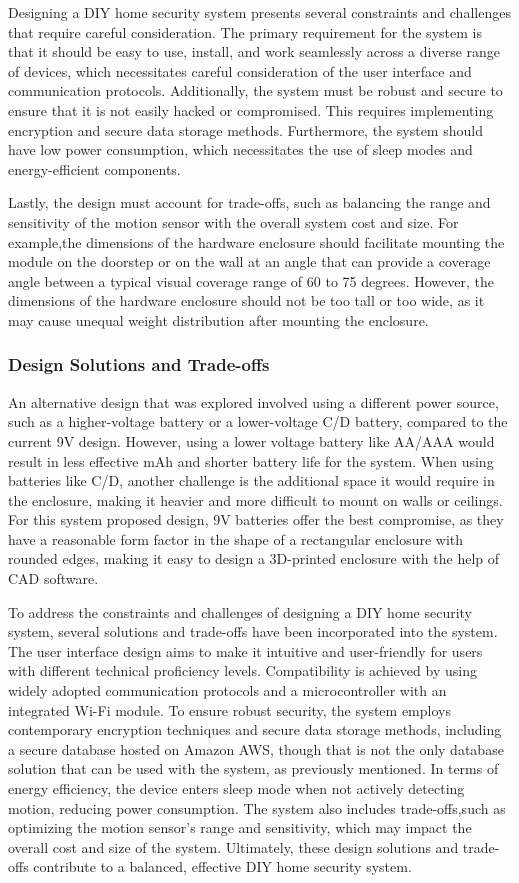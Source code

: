 Designing a DIY home security system presents several constraints and challenges that
require careful consideration. The primary requirement for the system is that it should be
easy to use, install, and work seamlessly across a diverse range of devices, which
necessitates careful consideration of the user interface and communication protocols.
Additionally, the system must be robust and secure to ensure that it is not easily
hacked or compromised. This requires implementing encryption and secure data storage methods.
Furthermore, the system should have low power consumption, which necessitates the use of sleep
modes and energy-efficient components.

Lastly, the design must account for trade-offs, such as balancing the range and sensitivity of
the motion sensor with the overall system cost and size. For example,the dimensions of the
hardware enclosure should facilitate mounting the module on the doorstep or on the wall at an
angle that can provide a coverage angle between a typical visual coverage range of 60 to 75
degrees. However, the dimensions of the hardware enclosure should not be too tall or too wide,
as it may cause unequal weight distribution after mounting the enclosure.

\subsubsection{Design Solutions and Trade-offs}

An alternative design that was explored involved using a different power source, such as a
higher-voltage battery or a lower-voltage C/D battery, compared to the current 9V design.
However, using a lower voltage battery like AA/AAA would result in less effective mAh and
shorter battery life for the system. When using batteries like C/D, another challenge is the
additional space it would require in the enclosure, making it heavier and more difficult to
mount on walls or ceilings. For this system proposed design, 9V batteries offer the best compromise, as they have a reasonable form factor in the shape of a rectangular enclosure with rounded edges, making it easy to design a 3D-printed enclosure with the help of CAD software.

To address the constraints and challenges of designing a DIY home security system, several
solutions and trade-offs have been incorporated into the system. The user interface design
aims to make it intuitive and user-friendly for users with different technical proficiency
levels. Compatibility is achieved by using widely adopted communication protocols and a
microcontroller with an integrated Wi-Fi module. To ensure robust security, the system employs
contemporary encryption techniques and secure data storage methods, including a secure
database hosted on Amazon AWS, though that is not the only database solution that can be used
with the system, as previously mentioned. In terms of energy efficiency, the device enters
sleep mode when not actively detecting motion, reducing power consumption. The system also
includes trade-offs,such as optimizing the motion sensor's range and sensitivity, which may
impact the overall cost and size of the system. Ultimately, these design solutions and
trade-offs contribute to a balanced, effective DIY home security system.
